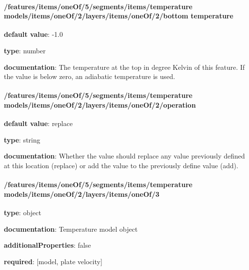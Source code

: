 \begin{itemized}
\end{itemized}\paragraph{/features/items/oneOf/5/segments/items/temperature models/items/oneOf/2/layers/items/oneOf/2/bottom temperature} \begin{itemized}
\item {\bf default value}: -1.0
\item {\bf type}: number
\item {\bf documentation}: The temperature at the top in degree Kelvin of this feature. If the value is below zero, an adiabatic temperature is used.
\end{itemized}\paragraph{/features/items/oneOf/5/segments/items/temperature models/items/oneOf/2/layers/items/oneOf/2/operation} \begin{itemized}
\item {\bf default value}: replace
\item {\bf type}: string
\item {\bf documentation}: Whether the value should replace any value previously defined at this location (replace) or add the value to the previously define value (add).
\end{itemized}\paragraph{/features/items/oneOf/5/segments/items/temperature models/items/oneOf/2/layers/items/oneOf/3} \begin{itemized}
\item {\bf type}: object
\item {\bf documentation}: Temperature model object
\item {\bf additionalProperties}: false
\item {\bf required}: [model, plate velocity]\end{itemized}
